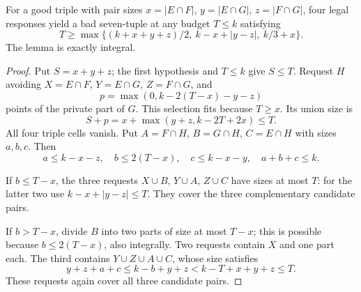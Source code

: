 \begin{lemma}\label{lem:split}
For a good triple with pair sizes $x=|E\cap F|$, $y=|E\cap G|$, $z=|F\cap G|$, four legal responses yield a bad seven-tuple at any budget $T\le k$ satisfying
\[
T\ge\max\{(k+x+y+z)/2,\ k-x+|y-z|,\ k/3+x\}.
\]
The lemma is exactly integral.
\end{lemma}
\begin{proof}
Put $S=x+y+z$; the first hypothesis and $T\le k$ give $S\le T$. Request $H$ avoiding $X=E\cap F$, $Y=E\cap G$, $Z=F\cap G$, and
\[
p=\max(0,k-2(T-x)-y-z)
\]
points of the private part of $G$. This selection fits because $T\ge x$. Its union size is
\[
S+p=x+\max(y+z,k-2T+2x)\le T.
\]
All four triple cells vanish. Put $A=F\cap H$, $B=G\cap H$, $C=E\cap H$ with sizes $a,b,c$. Then
\[
a\le k-x-z,\quad b\le2(T-x),\quad c\le k-x-y,\quad a+b+c\le k.
\]

If $b\le T-x$, the three requests $X\cup B$, $Y\cup A$, $Z\cup C$ have sizes at most $T$: for the latter two use $k-x+|y-z|\le T$. They cover the three complementary candidate pairs.

If $b>T-x$, divide $B$ into two parts of size at most $T-x$; this is possible because $b\le2(T-x)$, also integrally. Two requests contain $X$ and one part each. The third contains $Y\cup Z\cup A\cup C$, whose size satisfies
\[
y+z+a+c\le k-b+y+z<k-T+x+y+z\le T.
\]
These requests again cover all three candidate pairs.
\end{proof}

